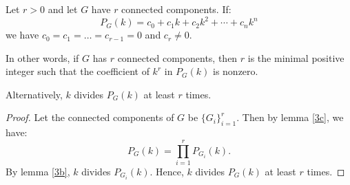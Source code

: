 \documentclass{unswmaths}
\begin{document}
\begin{lemma}[Part (d)]
    Let $r > 0$ and let $G$ have $r$ connected components. If:
    \begin{equation*}
        P_G(k) = c_0 + c_1k+c_2k^2 + \cdots + c_nk^n
    \end{equation*}
    we have $c_0 = c_1 = \ldots = c_{r-1} = 0$
    and $c_r \neq 0$.
    
    In other words, if $G$ has $r$ connected components, then
    $r$ is the minimal positive integer such that the coefficient
    of $k^r$ in $P_G(k)$ is nonzero.
   
    Alternatively, $k$ divides $P_G(k)$ at least $r$ times.
    
\end{lemma}
\begin{proof}
%    
%    
%    
%    
    
%    
%    
%    
    Let the connected components of $G$ be $\{G_i\}_{i=1}^r$. Then
    by lemma \ref{3c}, we have:
    \begin{equation*}
        P_G(k) = \prod_{i=1}^r P_{G_i}(k).
    \end{equation*}
    By lemma \ref{3b}, $k$ divides $P_{G_i}(k)$.
    Hence, $k$ divides $P_G(k)$ at least $r$ times.
\end{proof}
\end{document}
